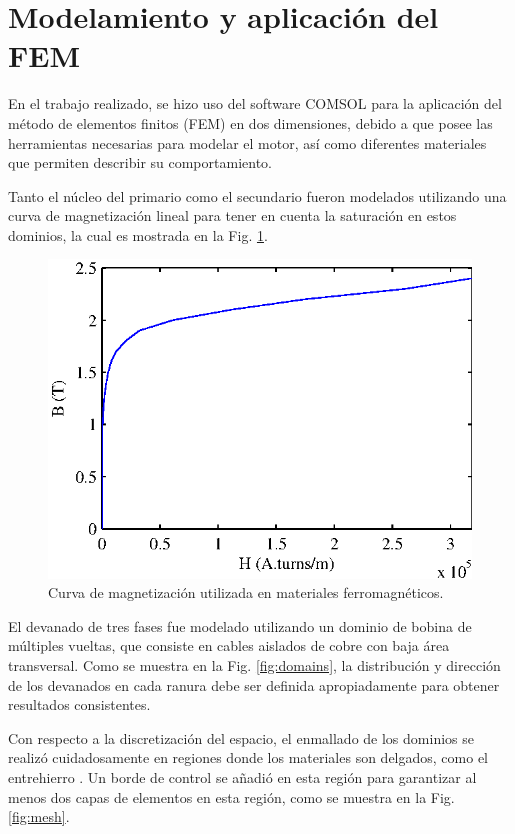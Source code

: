 \section{Modelamiento y aplicación del FEM}
En el trabajo realizado, se hizo uso del software COMSOL para la aplicación del método de elementos finitos (FEM) en dos dimensiones, debido a que posee las herramientas necesarias para modelar el motor, así como diferentes materiales que permiten describir su comportamiento.

Tanto el núcleo del primario como el secundario fueron modelados utilizando una curva de magnetización lineal para tener en cuenta la saturación en estos dominios, la cual es mostrada en la Fig. \ref{fig:magdata}.

\begin{figure}[btp]
\centering
\includegraphics[scale=1]{../img/Desarrollo_de_un_diseno_inicial/magdata.eps}
\caption{Curva de magnetización utilizada en materiales ferromagnéticos.}
\label{fig:magdata}
\end{figure}

El devanado de tres fases fue modelado utilizando un dominio de bobina de múltiples vueltas, que consiste en cables aislados de cobre con baja área transversal. Como se muestra en la Fig. \ref{fig:domains}, la distribución y dirección de los devanados en cada ranura debe ser definida apropiadamente para obtener resultados consistentes.

Con respecto a la discretización del espacio, el enmallado de los dominios se realizó cuidadosamente en regiones donde los materiales son delgados, como el entrehierro \cite{bianchi2011}. Un borde de control se añadió en esta región para garantizar al menos dos capas de elementos en esta región, como se muestra en la Fig. \ref{fig:mesh}.

